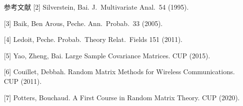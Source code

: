 \documentclass[UTF8,fontset=none]{ctexart}
\begin{document}
\begin{postercolumns}
\begin{postercolumn}
\begin{posterblock}[posterquiet]{参考文献}
  [2] Silverstein, Bai. J.\ Multivariate Anal.\ 54 (1995).

  [3] Baik, Ben Arous, Peche. Ann.\ Probab.\ 33 (2005).

  [4] Ledoit, Peche. Probab.\ Theory Relat.\ Fields 151 (2011).

  [5] Yao, Zheng, Bai. Large Sample Covariance Matrices. CUP (2015).

  [6] Couillet, Debbah. Random Matrix Methods for Wireless Communications. CUP (2011).

  [7] Potters, Bouchaud. A First Course in Random Matrix Theory. CUP (2020).
\end{posterblock}
\end{postercolumn}

\end{postercolumns}
\end{document}
